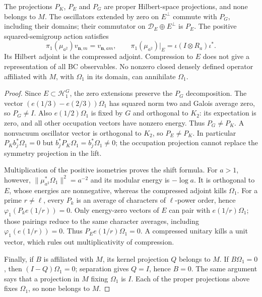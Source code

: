 \begin{proposition}
\label{v4-arith:consumer56:observable-obstruction}
The projections $P_K$, $P_E$ and $P_G$ are proper Hilbert-space
projections, and none belongs to $M$.
The oscillators extended by zero on $E^\perp$ commute with $P_G$,
including their domains; their commutator on
$\mathcal D_E\oplus E^\perp$ is $P_E$.
The positive squared-semigroup action satisfies
\[
 \pi_1(\mu_{a^2})v_{\mathbf n,m}=v_{\mathbf n,am},\qquad
 \pi_1(\mu_{a^2})|_E=\iota(I\otimes R_a)\iota^*.
\]
Its Hilbert adjoint is the compressed adjoint. Compression to $E$
does not give a representation of all BC observables. No nonzero
closed densely defined operator affiliated with $M$, with
$\Omega_1$ in its domain, can annihilate $\Omega_1$.
\end{proposition}
\begin{proof}
Since $E\subset\mathcal H_1^G$, the zero extensions preserve the
$P_G$ decomposition. The vector $(e(1/3)-e(2/3))\Omega_1$ has
squared norm two and Galois average zero, so $P_G\ne I$.
Also $e(1/2)\Omega_1$ is fixed by $G$ and orthogonal to $K_2$:
its expectation is zero, and all other occupation vectors have
nonzero energy. Thus $P_G\ne P_K$. A nonvacuum oscillator vector
is orthogonal to $K_2$, so $P_E\ne P_K$.
In particular $P_Kb_j^*\Omega_1=0$ but
$b_j^*P_K\Omega_1=b_j^*\Omega_1\ne0$; the occupation projection
cannot replace the symmetry projection in the lift.

Multiplication of the positive isometries proves the shift formula.
For $a>1$, however,
$\|\mu_{a^2}^*\Omega_1\|^2=a^{-2}$ and its modular energy is
$-\log a$. It is orthogonal to $E$, whose energies are nonnegative,
whereas the compressed adjoint kills $\Omega_1$.
For a prime $r\ne\ell$, every $P_k$ is an average of characters
of $\ell$-power order, hence $\varphi_1(P_ke(1/r))=0$.
Only energy-zero vectors of $E$ can pair with $e(1/r)\Omega_1$;
those pairings reduce to the same character averages, including
$\varphi_1(e(1/r))=0$. Thus $P_Ee(1/r)\Omega_1=0$.
A compressed unitary kills a unit vector, which rules out
multiplicativity of compression.

Finally, if $B$ is affiliated with $M$, its kernel projection
$Q$ belongs to $M$. If $B\Omega_1=0$, then
$(I-Q)\Omega_1=0$; separation gives $Q=I$, hence $B=0$.
The same argument says that a projection in $M$ fixing $\Omega_1$
is $I$. Each of the proper projections above fixes $\Omega_1$,
so none belongs to $M$.
\end{proof}

